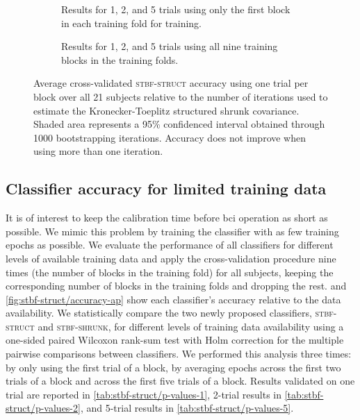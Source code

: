   \begin{figure}
    \sffamily
    \sansmath
    \begin{subfigure}{\linewidth}
      
      \caption{Results for 1, 2, and 5 trials using only the first block in each
      training fold for training.}
    \end{subfigure}
    \smallskip

    \begin{subfigure}{\linewidth}
      
      \caption{Results for 1, 2, and 5 trials using all nine training blocks in
      the training folds.}
    \end{subfigure}
    \caption[Average cross-validated \textsc{stbf-struct} accuracy]{%
      Average cross-validated \textsc{stbf-struct} accuracy using
			one trial per block over all 21 subjects
			relative to the number of iterations used to estimate the Kronecker-Toeplitz structured shrunk
			covariance. Shaded area represents a 95\% confidenced interval obtained
      through 1000 bootstrapping iterations.
      Accuracy does not improve when using more than one iteration.}
		\label{fig:iterations}
	\end{figure}

	\subsection{Classifier accuracy for limited training data}
	It is of interest to keep the calibration time before \ac{bci}
	operation as short as possible.
	We mimic this problem by training the classifier with as few training epochs as possible.
	We evaluate the performance of all classifiers for different levels of
	available training data and apply the cross-validation procedure nine times (the number of blocks in the training fold) for all subjects, keeping the
	corresponding number of blocks in the training folds and dropping the rest.
	 and \cref{fig:stbf-struct/accuracy-ap} show each classifier's
	accuracy relative to the data availability.
	We statistically compare the two newly proposed classifiers,
	\textsc{stbf-struct} and \textsc{stbf-shrunk}, for different levels of training
	data availability using a one-sided paired Wilcoxon rank-sum test with Holm correction for the multiple pairwise comparisons between classifiers.
	We performed this analysis three times: by only using the first trial of a
	block, by averaging epochs across the first two trials of a block and across
	the first five trials of a block.
	Results validated on one trial are reported in \cref{tab:stbf-struct/p-values-1}, 2-trial results
	in \cref{tab:stbf-struct/p-values-2}, and 5-trial results in \cref{tab:stbf-struct/p-values-5}.

